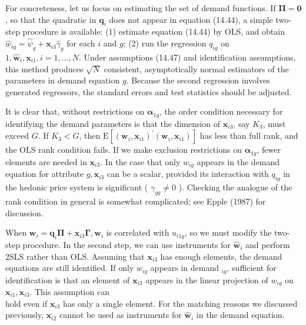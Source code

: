 \documentclass[10pt]{article}
\begin{document}
For concreteness, let us focus on estimating the set of demand functions. If $\boldsymbol{\Pi}=\mathbf{0}$, so that the quadratic in $\mathbf{q}_{i}$ does not appear in equation (14.44), a simple two-step procedure is available: (1) estimate equation (14.44) by OLS, and obtain $\hat{w}_{i g}= \hat{\psi}_{g}+\mathbf{x}_{i 3} \hat{\gamma}_{g}$ for each $i$ and $g$; (2) run the regression $q_{i g}$ on $1, \hat{\mathbf{w}}_{i}, \mathbf{x}_{i 1}, i=1, \ldots, N$. Under assumptions (14.47) and identification assumptions, this method produces $\sqrt{N}$ consistent, asymptotically normal estimators of the parameters in demand equation $g$. Because the second regression involves generated regressors, the standard errors and test statistics should be adjusted.

It is clear that, without restrictions on $\boldsymbol{\alpha}_{1 g}$, the order condition necessary for identifying the demand parameters is that the dimension of $\mathbf{x}_{i 3}$, say $K_{3}$, must exceed $G$. If $K_{3}<G$, then $\mathrm{E}\left[\left(\mathbf{w}_{i}, \mathbf{x}_{i 1}\right)^{\prime}\left(\mathbf{w}_{i}, \mathbf{x}_{i 1}\right)\right]$ has less than full rank, and the OLS rank condition fails. If we make exclusion restrictions on $\boldsymbol{\alpha}_{1 g}$, fewer elements are needed in $\mathbf{x}_{i 3}$. In the case that only $w_{i g}$ appears in the demand equation for attribute $g, \mathbf{x}_{i 3}$ can be a scalar, provided its interaction with $q_{i g}$ in the hedonic price system is significant ( $\gamma_{g g} \neq 0$ ). Checking the analogue of the rank condition in general is somewhat complicated; see Epple (1987) for discussion.

When $\mathbf{w}_{i}=\mathbf{q}_{i} \boldsymbol{\Pi}+\mathbf{x}_{i 3} \boldsymbol{\Gamma}, \mathbf{w}_{i}$ is correlated with $u_{i 1 g}$, so we must modify the two-step procedure. In the second step, we can use instruments for $\hat{\mathbf{w}}_{i}$ and perform 2SLS rather than OLS. Assuming that $\mathbf{x}_{i 3}$ has enough elements, the demand equations are still identified. If only $w_{i g}$ appears in demand ${ }_{i g}$, sufficient for identification is that an element of $\mathbf{x}_{i 3}$ appears in the linear projection of $w_{i g}$ on $\mathbf{x}_{i 1}, \mathbf{x}_{i 3}$. This assumption can\\
hold even if $\mathbf{x}_{i 3}$ has only a single element. For the matching reasons we discussed previously, $\mathbf{x}_{i 2}$ cannot be used as instruments for $\hat{\mathbf{w}}_{i}$ in the demand equation.
\end{document}
